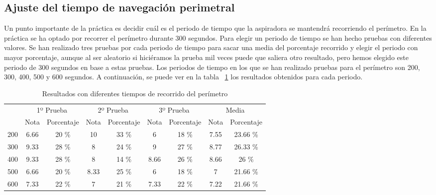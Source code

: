 \subsection{Ajuste del tiempo de navegación perimetral}
Un punto importante de la práctica es decidir cuál es el periodo de tiempo que la aspiradora se mantendrá recorriendo el perímetro. En la práctica se ha optado por recorrer el perímetro durante 300 segundos. Para elegir un periodo de tiempo se han hecho pruebas con diferentes valores. Se han realizado tres pruebas por cada periodo de tiempo para sacar una media del porcentaje recorrido y elegir el periodo con mayor porcentaje, aunque al ser aleatorio si hiciéramos la prueba mil veces puede que saliera otro resultado, pero hemos elegido este periodo de 300 segundos en base a estas pruebas. Los periodos de tiempo en los que se han realizado pruebas para el perímetro son 200, 300, 400, 500 y 600 segundos. A continuación, se puede ver en la tabla ~\ref{resultados_roomba} los resultados obtenidos para cada periodo.\\


\begin{table}[H]
\centering
\caption{Resultados con diferentes tiempos de recorrido del perímetro}
\label{resultados_roomba}
\begin{tabular}{c|c|c|c|c|c|c|c|c|}
\cline{2-9}
                          & \multicolumn{2}{c|}{1º Prueba} & \multicolumn{2}{c|}{2º Prueba} & \multicolumn{2}{c|}{3º Prueba} & \multicolumn{2}{c|}{Media} \\ \cline{2-9} 
                          & Nota        & Porcentaje       & Nota        & Porcentaje       & Nota        & Porcentaje       & Nota      & Porcentaje     \\ \hline
\multicolumn{1}{|c|}{200} & 6.66        & 20 \%            & 10          & 33 \%            & 6           & 18 \%            & 7.55      & 23.66 \%       \\ \hline
\multicolumn{1}{|c|}{300} & 9.33        & 28 \%            & 8           & 24 \%            & 9           & 27 \%            & 8.77      & 26.33 \%       \\ \hline
\multicolumn{1}{|c|}{400} & 9.33        & 28 \%            & 8           & 14 \%            & 8.66        & 26 \%            & 8.66      & 26 \%          \\ \hline
\multicolumn{1}{|c|}{500} & 6.66        & 20 \%            & 8.33        & 25 \%            & 6           & 18 \%            & 7         & 21.66 \%       \\ \hline
\multicolumn{1}{|c|}{600} & 7.33        & 22 \%            & 7           & 21 \%            & 7.33        & 22 \%            & 7.22      & 21.66 \%       \\ \hline
\end{tabular}
\end{table}

